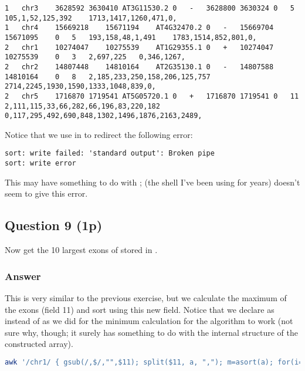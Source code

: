 \begin{lstlisting}[style=output]
1	chr3	3628592	3630410	AT3G11530.2	0	-	3628800	3630324	0	5	105,1,52,125,392	1713,1417,1260,471,0,
1	chr4	15669218	15671194	AT4G32470.2	0	-	15669704	15671095	0	5	193,158,48,1,491	1783,1514,852,801,0,
2	chr1	10274047	10275539	AT1G29355.1	0	+	10274047	10275539	0	3	2,697,225	0,346,1267,
2	chr2	14807448	14810164	AT2G35130.1	0	-	14807588	14810164	0	8	2,185,233,250,158,206,125,757	2714,2245,1930,1590,1333,1048,839,0,
2	chr5	1716870	1719541	AT5G05720.1	0	+	1716870	1719541	0	11	2,111,115,33,66,282,66,196,83,220,182	0,117,295,492,690,848,1302,1496,1876,2163,2489,
\end{lstlisting}

Notice that we use  in  to redirect the following error:
\begin{lstlisting}[style=output]
sort: write failed: 'standard output': Broken pipe
sort: write error
\end{lstlisting}

This may have something to do with ;  (the shell I've been using for years) doesn't seem to give this error.

\subsection*{Question 9 (1p)}
Now get the 10 largest exons of  stored in .

\subsubsection*{Answer}
This is very similar to the previous exercise, but we calculate the maximum of the exons (field 11) and sort using this new field. Notice that we declare  as  instead of  as we did for the minimum calculation for the algorithm to work (not sure why, though; it surely has something to do with the internal structure of the constructed array).

\begin{lstlisting}[language=bash]
awk '/chr1/ { gsub(/,$/,"",$11); split($11, a, ","); m=asort(a); for(i=1;i<=length(a);i++) if(a[i]>m) m=a[i];  print m, $0}' OFS="\t" example.bed | sort -r -n 2>/dev/null | head
\end{lstlisting}

